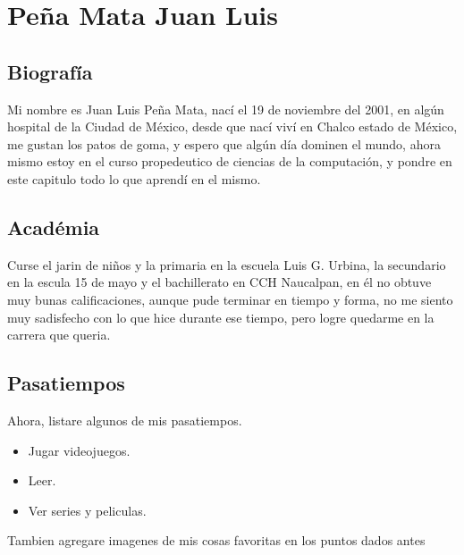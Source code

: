 \chapter{Peña Mata Juan Luis}

\section{Biografía}
Mi nombre es Juan Luis Peña Mata, nací el 19 de noviembre
del 2001, en algún hospital de la Ciudad de México, desde
que nací viví en Chalco estado de México, me gustan los
patos de goma, y espero que algún día dominen el mundo,
ahora mismo estoy en el curso propedeutico de ciencias de
la computación, y pondre en este capitulo todo lo que
aprendí en el mismo.

\section{Académia}
Curse el jarin de niños y la primaria en la escuela
Luis G. Urbina, la secundario en la escula 15 de mayo
y el bachillerato en CCH Naucalpan, en él no obtuve muy
bunas calificaciones, aunque pude terminar en tiempo
y forma, no me siento muy sadisfecho con lo que hice
durante ese tiempo, pero logre quedarme en la carrera que
queria.

\section{Pasatiempos}
Ahora, listare algunos de mis pasatiempos.
\begin{itemize}
\item Jugar videojuegos.
\item Leer.
\item Ver series y peliculas.
\end{itemize}

Tambien agregare imagenes de mis cosas favoritas en los puntos dados antes

